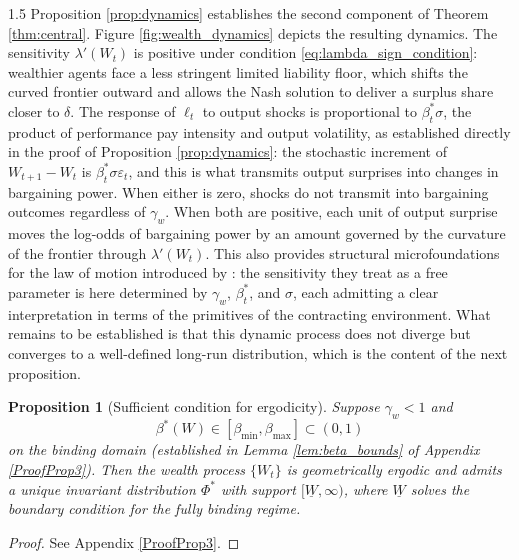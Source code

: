\documentclass[12pt]{article}
\newtheorem{proposition}{Proposition}[section]
\theoremstyle{definition}
\theoremstyle{plain}
\begin{document}
\begin{spacing}{1.5}
Proposition \ref{prop:dynamics} establishes the second component of Theorem \ref{thm:central}. Figure \ref{fig:wealth_dynamics} depicts the resulting dynamics. The sensitivity $\lambda'(W_t)$ is positive under condition \eqref{eq:lambda_sign_condition}: wealthier agents face a less stringent limited liability floor, which shifts the curved frontier outward and allows the Nash solution to deliver a surplus share closer to $\delta$. The response of $\ell_t$ to output shocks is proportional to $\beta_t^* \sigma$, the product of performance pay intensity and output volatility, as established directly in the proof of Proposition \ref{prop:dynamics}: the stochastic increment of $W_{t+1} - W_t$ is $\beta_t^* \sigma \varepsilon_t$, and this is what transmits output surprises into changes in bargaining power. When either is zero, shocks do not transmit into bargaining outcomes regardless of $\gamma_w$. When both are positive, each unit of output surprise moves the log-odds of bargaining power by an amount governed by the curvature of the frontier through $\lambda'(W_t)$. This also provides structural microfoundations for the law of motion introduced by \textcite{digiannatale2025}: the sensitivity they treat as a free parameter is here determined by $\gamma_w$, $\beta_t^*$, and $\sigma$, each admitting a clear interpretation in terms of the primitives of the contracting environment. What remains to be established is that this dynamic process does not diverge but converges to a well-defined long-run distribution, which is the content of the next proposition.

\begin{proposition}[Sufficient condition for ergodicity]\label{prop:ergodic}
Suppose $\gamma_w < 1$ and $$\beta^*(W) \in [\beta_{\min}, \beta_{\max}] \subset (0,1)$$ on the binding domain (established in Lemma \ref{lem:beta_bounds} of Appendix \ref{ProofProp3}). Then the wealth process $\{W_t\}$ is geometrically ergodic and admits a unique invariant distribution $\Phi^*$ with support $[\underline{W}, \infty)$, where $\underline{W}$ solves the boundary condition for the fully binding regime.
\end{proposition}

\begin{proof}
See Appendix \ref{ProofProp3}.
\end{proof}


\end{spacing}
\end{document}
